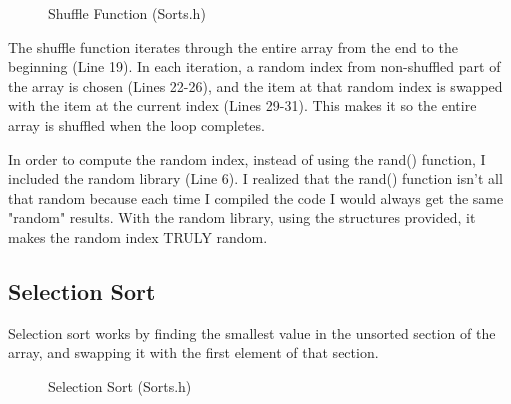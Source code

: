 \documentclass[letterpaper, 10pt]{article}
\begin{document}
\begin{figure}[H]
  \centering
  
  \caption{Shuffle Function (Sorts.h)}
  \label{fig:figure4.2-part2}
\end{figure}
\noindent
The shuffle function iterates through the entire array from the end to the beginning (Line 19). In each iteration, a random index from non-shuffled part of the array is chosen (Lines 22-26), and the item at that random index is swapped with the item at the current index (Lines 29-31). This makes it so the entire array is shuffled when the loop completes.

\noindent
In order to compute the random index, instead of using the rand() function, I included the random library (Line 6). I realized that the rand() function isn't all that random because each time I compiled the code I would always get the same "random" results. With the random library, using the structures provided, it makes the random index TRULY random.

\subsection{Selection Sort}
\noindent
Selection sort works by finding the smallest value in the unsorted section of the array, and swapping it with the first element of that section. 
\begin{figure}[H]
  \centering
  
  \label{fig:figure4.3-part1}
\end{figure}

\begin{figure}[H]
  \centering
  
  \caption{Selection Sort (Sorts.h)}
  \label{fig:figure4.3-part2}
\end{figure}
\end{document}

